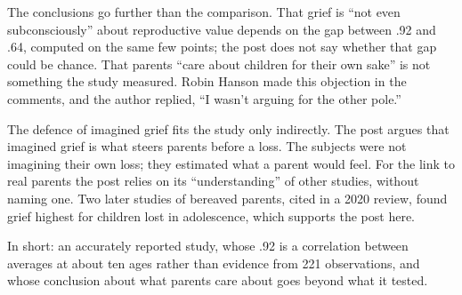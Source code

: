 \begin{afterword}
The conclusions go further than the comparison. That grief is ``not even subconsciously'' about reproductive value depends on the gap between .92 and .64, computed on the same few points; the post does not say whether that gap could be chance. That parents ``care about children for their own sake'' is not something the study measured. Robin Hanson made this objection in the comments, and the author replied, ``I wasn't arguing for the other pole.''

The defence of imagined grief fits the study only indirectly. The post argues that imagined grief is what steers parents before a loss. The subjects were not imagining their own loss; they estimated what a parent would feel. For the link to real parents the post relies on its ``understanding'' of other studies, without naming one. Two later studies of bereaved parents, cited in a 2020 review, found grief highest for children lost in adolescence, which supports the post here.

In short: an accurately reported study, whose .92 is a correlation between averages at about ten ages rather than evidence from 221 observations, and whose conclusion about what parents care about goes beyond what it tested.
\end{afterword}

